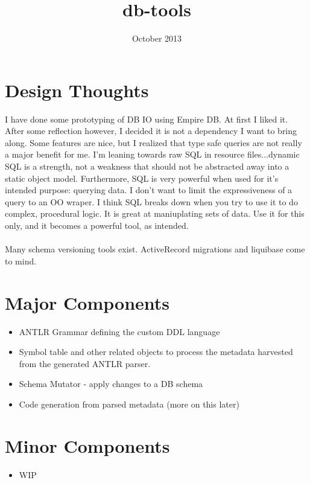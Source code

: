 \documentclass[10pt]{article}
\title{db-tools}
\date{October 2013}
\begin{document}
 \maketitle

\section*{Design Thoughts}

I have done some prototyping of DB IO using Empire DB. At
first I liked it. After some reflection however, I decided it is not a 
dependency I want to bring along. Some features are nice, but I
realized that 
type safe
queries are not really a major benefit for me. I'm leaning towards raw SQL in
resource files...dynamic SQL is a strength, not a weakness that should
not be abstracted away into a static object model.
Furthermore, SQL is very powerful when used for it's intended purpose: querying
data. I don't want to limit the expressiveness of a query to an OO
wraper. I think SQL breaks down when you try to use it to do complex,
procedural logic. It is great at maniuplating sets of data. Use it for
this only, and it becomes a powerful tool, as intended. 
\\
\\
Many schema versioning tools exist. ActiveRecord migrations and
liquibase come to mind.
%
%

\section*{Major Components}
\begin{itemize}
  \item ANTLR Grammar defining the custom DDL language
  \item Symbol table and other related objects to process the metadata
   harvested from the generated ANTLR parser.
   \item Schema Mutator - apply changes to a DB schema
 \item Code generation from parsed metadata (more on this later)
 
 \end{itemize}

\section*{Minor Components}
\begin {itemize}
\item WIP
\end{itemize}
\end{document}
